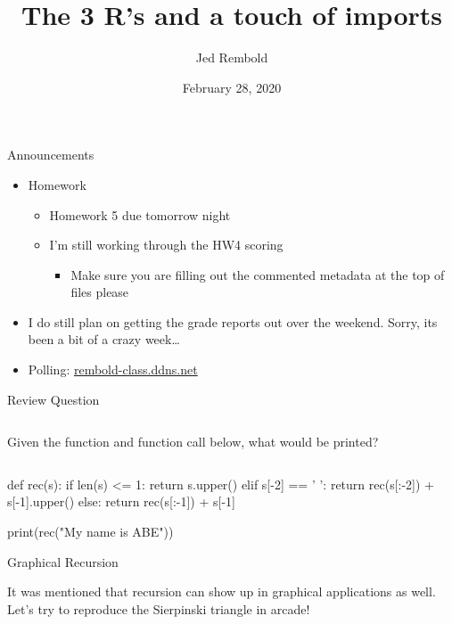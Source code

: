 \documentclass[pdf, aspectratio=169, 12pt]{beamer}
\title{The 3 R's and a touch of imports}
\author{Jed Rembold}
\date{February 28, 2020}
\begin{document}
\begin{frame}{Announcements}
	\begin{itemize}
		\item Homework
			\begin{itemize}
				\item Homework 5 due tomorrow night
				\item I'm still working through the HW4 scoring
					\begin{itemize}
						\item Make sure you are filling out the commented metadata at the top of files please
					\end{itemize}
			\end{itemize}
		\item I do still plan on getting the grade reports out over the weekend. Sorry, its been a bit of a crazy week\ldots
		\item Polling: \url{rembold-class.ddns.net}
	\end{itemize}
\end{frame}

\begin{frame}[fragile]{Review Question}
	\begin{columns}
		Given the function and function call below, what would be printed?
		\begin{poll}
		\item {}
		\item {}
		\item {}
		\item {}
		\end{poll}
	\end{columns}
	\vspace{-2mm}
	\begin{pythoncode}
		def rec(s):
			if len(s) <= 1:
				return s.upper()
			elif s[-2] == ' ':
				return rec(s[:-2]) + s[-1].upper()
			else:
				return rec(s[:-1]) + s[-1]

		print(rec("My name is ABE"))
	\end{pythoncode}
\end{frame}

\begin{frame}{Graphical Recursion}
	\begin{example}
		It was mentioned that recursion can show up in graphical applications as well. Let's try to reproduce the Sierpinski triangle in arcade!
	\end{example}
\end{frame}
\end{document}
